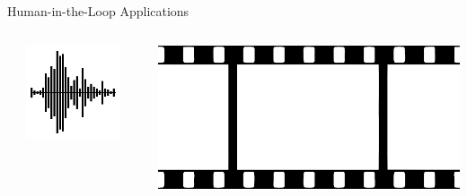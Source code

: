 \documentclass[aspectratio=1610]{beamer}
\begin{document}
\begin{frame}{Human-in-the-Loop Applications}
    \begin{columns}[onlytextwidth]
        \begin{column}{.335\linewidth}%
        \end{column}%
        \begin{column}{.1\linewidth}
            \centering%
            \includegraphics[width=\linewidth]{img/sound_wave.png}
        \end{column}%
        \begin{column}{.01\linewidth}
        \end{column}%
        \begin{column}{.1\linewidth}
            \centering%
            \includegraphics[width=\linewidth]{img/film.png}

\end{column}
\end{columns}
\end{frame}
\end{document}
